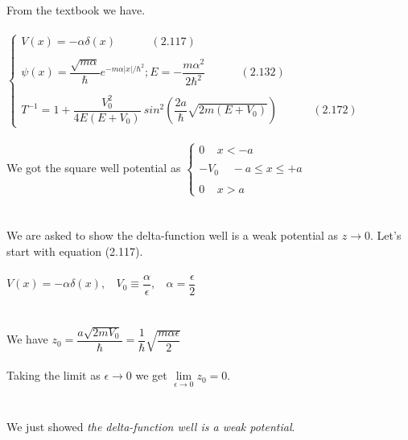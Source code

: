 \documentclass[fleqn]{article}
\begin{document}
    \textcolor{hwColor}{
      From the textbook we have. \\
      \\
      $
        \begin{cases}
          V(x)=-\alpha \delta(x) ~~~~~~~~~~~~~~ (2.117) \\
          \\
          \psi(x)=\dfrac{\sqrt{m \alpha}}{\hbar} e^{-m \alpha |x|/\hbar^2}; E=-\dfrac{m \alpha^2}{2\hbar^2} ~~~~~~~~~~~~~~ (2.132) \\
          \\
          T^{-1}=1+\dfrac{V^2_0}{4E(E+V_0)} ~ sin^2 \left(\dfrac{2a}{\hbar} \sqrt{2m(E+V_0)}\right) ~~~~~~~~~~~~~~ (2.172)
        \end{cases}
      $
      \\
      \\
      We got the square well potential as 
      $
        \begin{cases}
          0 ~~~~~ x<-a \\
          \\
          -V_0 ~~~~~ -a\leqslant x \leqslant +a \\
          \\
          0 ~~~~~ x>a
        \end{cases}
      $ \\
      \\
      \\
      We are asked to show the delta-function well is a weak potential as $z \to 0$. Let's start with
      equation (2.117). 
      \\ 
      \\
      $
        V(x)=-\alpha \delta(x), ~~~~ V_0 \equiv \dfrac{\alpha}{\epsilon}, ~~~~ \alpha=\dfrac{\epsilon}{2}
      $ \\
      \\
      \\
      We have $z_0=\dfrac{a \sqrt{2mV_0}}{\hbar}=\dfrac{1}{\hbar}\sqrt{\dfrac{m \alpha \epsilon}{2}}$ \\ \\
      Taking the limit as $\epsilon \to 0$ we get $\lim\limits_{\epsilon \to 0} z_0=0$. \\
      \\
      \\
      We just showed \emph{the delta-function well is a weak potential}. \\
      \\
      \\
}
\end{document}
